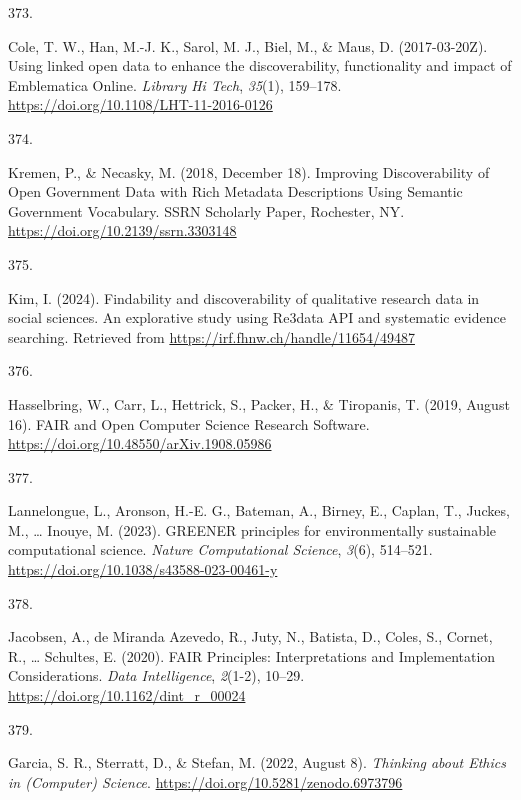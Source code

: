 \documentclass[
  11pt,
  letterpaper,
]{scrreprt}
\newlength{\cslhangindent}
\newlength{\csllabelwidth}
\newenvironment{CSLReferences}[2] %
 {\begin{list}{}{%
  \setlength{\itemindent}{0pt}
  \setlength{\leftmargin}{0pt}
  \setlength{\parsep}{0pt}
  \ifodd #1
   \setlength{\leftmargin}{\cslhangindent}
   \setlength{\itemindent}{-1\cslhangindent}
  \fi
  \setlength{\itemsep}{#2\baselineskip}}}
 {\end{list}}
\newcommand{\CSLLeftMargin}[1]{\parbox[t]{\csllabelwidth}{\strut#1\strut}}
\newcommand{\CSLRightInline}[1]{\parbox[t]{\linewidth - \csllabelwidth}{\strut#1\strut}}
\begin{document}
\begin{CSLReferences}{0}{0}
\CSLLeftMargin{373. }%
\CSLRightInline{Cole, T. W., Han, M.-J. K., Sarol, M. J., Biel, M., \&
Maus, D. (2017-03-20Z). Using linked open data to enhance the
discoverability, functionality and impact of {Emblematica Online}.
\emph{Library Hi Tech}, \emph{35}(1), 159--178.
\url{https://doi.org/10.1108/LHT-11-2016-0126}}

\CSLLeftMargin{374. }%
\CSLRightInline{Kremen, P., \& Necasky, M. (2018, December 18).
Improving {Discoverability} of {Open Government Data} with {Rich
Metadata Descriptions Using Semantic Government Vocabulary}. SSRN
Scholarly Paper, Rochester, NY.
\url{https://doi.org/10.2139/ssrn.3303148}}

\CSLLeftMargin{375. }%
\CSLRightInline{Kim, I. (2024). Findability and discoverability of
qualitative research data in social sciences. {An} explorative study
using Re3data {API} and systematic evidence searching. Retrieved from
\url{https://irf.fhnw.ch/handle/11654/49487}}

\CSLLeftMargin{376. }%
\CSLRightInline{Hasselbring, W., Carr, L., Hettrick, S., Packer, H., \&
Tiropanis, T. (2019, August 16). {FAIR} and {Open Computer Science
Research Software}. \url{https://doi.org/10.48550/arXiv.1908.05986}}

\CSLLeftMargin{377. }%
\CSLRightInline{Lannelongue, L., Aronson, H.-E. G., Bateman, A., Birney,
E., Caplan, T., Juckes, M., \ldots{} Inouye, M. (2023). {GREENER}
principles for environmentally sustainable computational science.
\emph{Nature Computational Science}, \emph{3}(6), 514--521.
\url{https://doi.org/10.1038/s43588-023-00461-y}}

\CSLLeftMargin{378. }%
\CSLRightInline{Jacobsen, A., de Miranda Azevedo, R., Juty, N., Batista,
D., Coles, S., Cornet, R., \ldots{} Schultes, E. (2020). {FAIR
Principles}: {Interpretations} and {Implementation Considerations}.
\emph{Data Intelligence}, \emph{2}(1-2), 10--29.
\url{https://doi.org/10.1162/dint_r_00024}}

\CSLLeftMargin{379. }%
\CSLRightInline{Garcia, S. R., Sterratt, D., \& Stefan, M. (2022, August
8). \emph{Thinking about {Ethics} in ({Computer}) {Science}}.
\url{https://doi.org/10.5281/zenodo.6973796}}


\end{CSLReferences}
\end{document}
